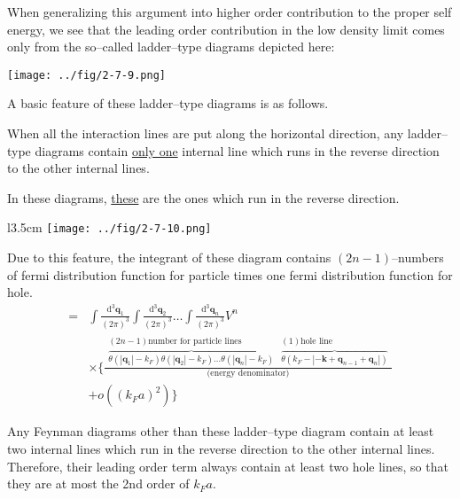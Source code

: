 When generalizing this argument into higher order contribution to the proper self energy, we see that the leading order contribution in the low density limit comes only from the so--called ladder--type diagrams depicted here:

\begin{center}
\texttt{[image: ../fig/2-7-9.png]}\label{Fig2.7.9}
\begin{equation} \label{Eqs2.7.3}\end{equation}
\end{center}

A basic feature of these ladder--type diagrams is as follows.

When all the interaction lines are put along the horizontal direction, any ladder--type diagrams contain \underline{only one} internal line which runs in the reverse direction to the other internal lines.

In these diagrams, \underline{these} are the ones which run in the reverse direction.

\begin{wrapfigure}[6]{l}{3.5cm}
\label{Fig2.7.10} \texttt{[image: ../fig/2-7-10.png]}
\end{wrapfigure}
Due to this feature, the integrant of these diagram contains $(2n-1)$--numbers of fermi distribution function for particle times one fermi distribution function for hole.
\[ \begin{split}
= &\int \frac{\mathrm{d}^3 \mathbf{q}_1}{(2\pi)^3} \int \frac{\mathrm{d}^3 \mathbf{q}_2}{(2\pi)^3} \ldots \int \frac{\mathrm{d}^3 \mathbf{q}_n}{(2\pi)^3} V^n \\
& \times \{  \frac{
\begin{matrix} (2n-1)\text{number for particle lines} \\ \overbrace{ \theta(|\mathbf{q}_1|-k_F)\theta(|\mathbf{q}_2|-k_F)\ldots\theta(|\mathbf{q}_n|-k_F) } \end{matrix}
\begin{matrix} (1) \text{hole line} \\ \overbrace{ \theta(k_F-|-\mathbf{k}+\mathbf{q}_{n-1}+\mathbf{q}_n|)} \end{matrix}}{\text{(energy denominator)}}\\
& + o((k_F a)^2) \}
\end{split} \]

Any Feynman diagrams other than these ladder--type diagram contain at least two internal lines which run in the reverse direction to the other internal lines. Therefore, their leading order term always contain at least two hole lines, so that they are at most the 2nd order of $k_F a$.

